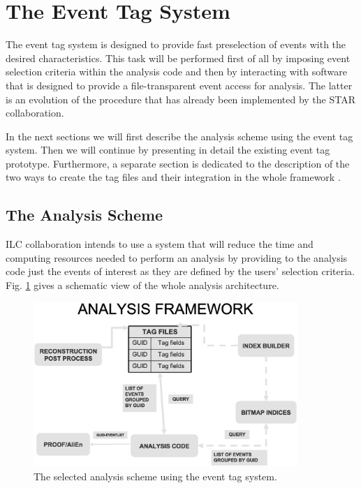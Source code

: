 \documentclass[12pt,a4paper,twoside]{article}
\begin{document}
{\section{The Event Tag System}

The event tag system \cite{EventTag} is designed to provide fast
preselection of 
events with the desired characteristics. This task will be performed
first of all by imposing event selection criteria within the analysis
code and then by interacting with software that is designed to provide
a file-transparent event access for analysis. The latter is an
evolution of the procedure that has already been implemented by the
STAR \cite{STAR} collaboration. 

In the next sections we will first describe the analysis scheme using
the event tag system. Then we will continue by presenting in detail
the existing event tag prototype. Furthermore, a separate section is
dedicated to the description of the two ways to create the tag files
and their integration in the whole framework \cite{CompTDR}. 

\subsection{The Analysis Scheme}

ILC collaboration intends to use a system that will reduce the time
and computing resources needed to perform an analysis by providing to
the analysis code just the events of interest as they are defined by
the users' selection criteria. Fig. \ref{analysis} gives a schematic
view of the whole analysis architecture.

\begin{figure}[ht!]
   \centering
   \includegraphics[width=10cm]{picts/tagana}
   \caption{The selected analysis scheme using the event tag system. }
   \label{analysis}
\end{figure}

}
\end{document}
